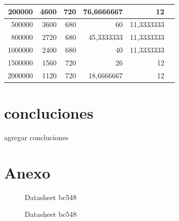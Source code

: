 \documentclass[12pt, letterpaper]{article}
\begin{document}
\begin{table}[H]
\begin{tabular}{|r|r|r|r|r|r}
    \cmidrule   200000 & 4600  & 720   & 76,6666667 & 12    &  \\
    
    \cmidrule   500000 & 3600  & 680   & 60    & 11,3333333 &  \\
    
    \cmidrule    800000 & 2720  & 680   & 45,3333333 & 11,3333333 &  \\
    
    \cmidrule    1000000 & 2400  & 680   & 40    & 11,3333333 &  \\
    \cmidrule   1500000 & 1560  & 720   & 26    & 12    &  \\
    \cmidrule    2000000 & 1120  & 720   & 18,6666667 & 12    &  \\
    \cmidrule    
    \end{tabular}
    \label{tab:tab_resp_frec}
\end{table}

\section{concluciones}
 agregar concluciones

\newpage
\section{Anexo}
\begin{figure}[H]
    \centering
    
    \caption{Datasheet bc548}
    \label{fig:datasheet_bc548}
\end{figure}
\newpage
\begin{figure}[H]
    \centering
    
    \caption{Datasheet bc548}
\end{figure}


\label{LastPage}
\end{document}
